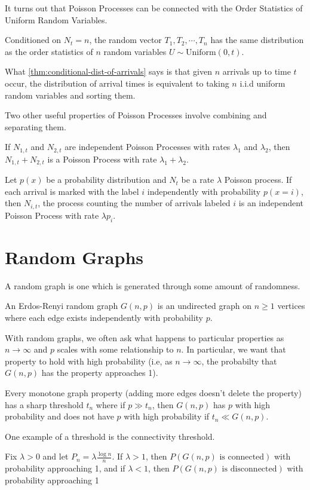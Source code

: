 It turns out that Poisson Processes can be connected with the Order Statistics of Uniform Random Variables.
\begin{theorem}
	Conditioned on $N_t = n$, the random vector $T_1, T_2, \cdots, T_n$ has the same distribution as the order statistics of $n$ random variables $U\sim \text{Uniform}(0, t)$.
	\label{thm:conditional-dist-of-arrivals}
\end{theorem}
What \cref{thm:conditional-dist-of-arrivals} says is that given $n$ arrivals up to time $t$ occur, the distribution of arrival times is equivalent to taking $n$ i.i.d uniform random variables and sorting them.

Two other useful properties of Poisson Processes involve combining and separating them.
\begin{theorem}
	If $N_{1,t}$ and $N_{2,t}$ are independent Poisson Processes with rates $\lambda_1$ and $\lambda_2$, then $N_{1, t} + N_{2,t}$ is a Poisson Process with rate $\lambda_1+\lambda_2$.
	\label{thm:poisson-merging}
\end{theorem}
\begin{theorem}
	Let $p(x)$ be a probability distribution and $N_t$ be a rate $\lambda$ Poisson process. If each arrival is marked with the label $i$ independently with probability $p(x=i)$, then $N_{i,t}$, the process counting the number of arrivals labeled $i$ is an independent Poisson Process with rate $\lambda p_i$.
	\label{thm:poisson-splitting}
\end{theorem}
\section{Random Graphs}
A random graph is one which is generated through some amount of randomness.
\begin{definition}
	An Erdos-Renyi random graph $G(n, p)$ is an undirected graph on $n \geq 1$ vertices where each edge exists independently with probability $p$.
	\label{defn:erdos-renyi}
\end{definition}
With random graphs, we often ask what happens to particular properties as $n\to\infty$ and $p$ scales with some relationship to $n$.
In particular, we want that property to hold with high probability (i.e, as $n\to\infty$, the probabilty that $G(n,p)$ has the property approaches 1).
\begin{theorem}
	Every monotone graph property (adding more edges doesn't delete the property) has a sharp threshold $t_n$ where if $p	\gg t_n$, then $G(n, p)$ has $p$ with high probability and does not have $p$ with high probability if $t_n \ll G(n,p)$.
	\label{thm:graph-sharp-threshold}
\end{theorem}
One example of a threshold is the connectivity threshold.
\begin{theorem}
	Fix $\lambda > 0$ and let $P_n = \lambda \frac{\log n}{n}$. If $\lambda > 1$, then $P(G(n,p)\text{ is connected})$ with probability approaching 1, and if $\lambda < 1$, then $P(G(n,p)\text{ is disconnected})$ with probability approaching 1
	\label{thm:erdos-renyi}
\end{theorem}
